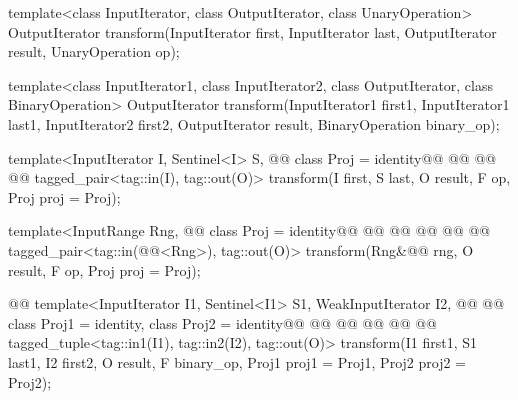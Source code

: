 %
\begin{removedblock}
\begin{itemdecl}
template<class InputIterator, class OutputIterator,
         class UnaryOperation>
  OutputIterator
    transform(InputIterator first, InputIterator last,
              OutputIterator result, UnaryOperation op);

template<class InputIterator1, class InputIterator2,
         class OutputIterator, class BinaryOperation>
  OutputIterator
    transform(InputIterator1 first1, InputIterator1 last1,
              InputIterator2 first2, OutputIterator result,
              BinaryOperation binary_op);
\end{itemdecl}
\end{removedblock}
\begin{addedblock}
\begin{itemdecl}
template<InputIterator I, Sentinel<I> S, @@ class Proj = identity@\oldtxt{,}\newtxt{>}@
    @@
    @@
  @@
  tagged_pair<tag::in(I), tag::out(O)>
    transform(I first, S last, O result, F op, Proj proj = Proj{});

template<InputRange Rng, @@ class Proj = identity@\oldtxt{,}\newtxt{>}@
    @@
    @@
      @@
  @@
    @@
  tagged_pair<tag::in(@@<Rng>), tag::out(O)>
    transform(Rng&@\newtxt{\&}@ rng, O result, F op, Proj proj = Proj{});

@@
template<InputIterator I1, Sentinel<I1> S1, WeakInputIterator I2, @@
    @@ class Proj1 = identity, class Proj2 = identity@\oldtxt{,}\newtxt{>}@
    @@
    @@
      @@
  @@
    @@
  tagged_tuple<tag::in1(I1), tag::in2(I2), tag::out(O)>
    transform(I1 first1, S1 last1, I2 first2, O result,
              F binary_op, Proj1 proj1 = Proj1{}, Proj2 proj2 = Proj2{});


\end{itemdecl}
\end{addedblock}
